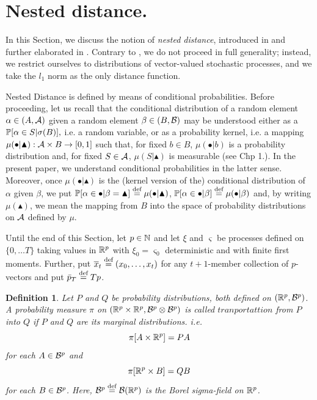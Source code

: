 \documentclass{article}              %
\newtheorem{definition}{Definition}
\begin{document}
\section{\label{sec:Nested}Nested distance.}

In this Section, we discuss the notion of {\em nested distance}, introduced
in \cite{pflug2012distance} and further elaborated in \cite{pflug2014multistage}.
Contrary to \cite{pflug2014multistage}, we do not proceed in full
generality; instead, we restrict ourselves to distributions of vector-valued
stochastic processes, and we take the $l_{1}$ norm as the only distance
function.

Nested Distance is defined by means of conditional probabilities.
Before proceeding, let us recall that the conditional distribution of
a random element $\alpha\in(A,\A)$ given a random element $\beta\in(B,\B)$
may be understood either as a $\P[\alpha\in S|\sigma(B)],$ i.e. a
random variable, or as a probability kernel, i.e. a mapping $\mu(\bullet|\blacktriangle):\A\times B\rightarrow[0,1]$
such that, for fixed $b\in B$, $\mu(\bullet|b)$ is a probability
distribution and, for fixed $S\in\A$, $\mu(S|\blacktriangle)$ is
measurable (see \cite{Kallenberg02} Chp 1.). In the present paper,
we understand conditional probabilities in the latter sense. Moreover, once
$\mu(\bullet|\blacktriangle)$ is the (kernel version of the) conditional
distribution of $\alpha$ given $\beta$, we put $\P[\alpha\in\bullet|\beta=\blacktriangle]\defined\mu(\bullet|\blacktriangle)$,
$\P[\alpha\in\bullet|\beta]\defined\mu(\bullet|\beta)$ and, by writing
$\mu(\blacktriangle)$, we mean the mapping from $B$ into the
space of probability distributions on $\A$ defined by $\mu$.

Until the end of this Section, let $p\in\N$ and let $\xi$ and $\varsigma$
be processes defined on $\{0,\dots T\}$ taking values in $\R^{p}$
with $\xi_{0}=\varsigma_{0}$ deterministic and with finite first
moments. Further, put $\overline{x}_{t}\defined(x_{0},\dots,x_{t})$
for any $t+1$-member collection of $p$-vectors and put $\bar{p}_{T}\defined Tp$.

\begin{definition}
Let $P$ and $Q$ be probability distributions, both defined on $(\R^{p},\B^{p})$. A probability measure $\pi$ on $(\R^{p}\times\R^{p},\B^{p}\otimes\B^{p})$
is called \emph{$tranportattion$ from $P$ into $Q$ }if $P$ and
$Q$ are its marginal distributions. i.e.
\begin{equation}
\pi[A\times\R^{p}]=PA\label{eq:tpp}
\end{equation}
for each $A\in\B^{p}$ and 
\begin{equation}
\pi[\R^{p}\times B]=QB\label{eq:tpq}
\end{equation}
for each $B\in\B^{p}$. Here, $\B^{p}\defined\B(\R^{p})$ is the Borel
sigma-field on $\R^{p}$.
\end{definition}
\end{document}
